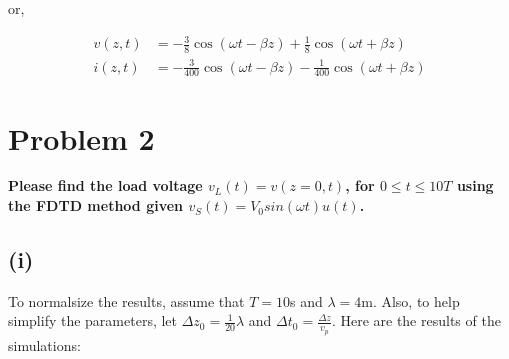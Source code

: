\documentclass{article}
\begin{document}
    or, 

    \begin{align}
        v(z, t) &= -\frac{3}{8}\cos(\omega t - \beta z) + \frac{1}{8}\cos(\omega t + \beta z) \nonumber \\
        i(z, t) &= -\frac{3}{400}\cos(\omega t - \beta z) - \frac{1}{400}\cos(\omega t + \beta z) \nonumber
    \end{align}

\section{Problem 2}

    \textbf{Please find the load voltage $v_L(t) = v(z=0,t)$, for $0 \leq t \leq 10T$ using the 
    FDTD method given $v_S(t) = V_0sin(\omega t) u(t)$. }

    \subsection{(i)}

        To normalsize the results, assume that $T = 10$s and $\lambda = 4$m. Also, to help simplify the parameters, let $\Delta z_0 = \frac{1}{20}\lambda$ and $\Delta t_0 = \frac{\Delta z }{v_p}$. Here are the results of the simulations:
\end{document}
